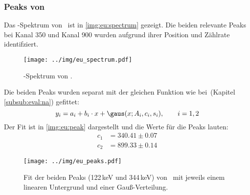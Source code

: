 \subsubsection{Peaks von \eu}
\label{subsub:eval:eu}
Das \textgamma-Spektrum von \eu\, ist in \autoref{img:eu:spectrum} gezeigt. Die beiden relevante Peaks bei Kanal 350 und Kanal 900 wurden aufgrund 
ihrer Position und Zählrate identifziert.
\begin{figure}[H]
\begin{center}
  \texttt{[image: ../img/eu\_spectrum.pdf]}
  \caption{\textgamma-Spektrum von .}
  \label{img:eu:spectrum}
\end{center}
\end{figure}
Die beiden Peaks wurden separat mit der gleichen Funktion wie bei \na\,(Kapitel \ref{subsub:eval:na}) gefittet:
\begin{equation}
  y_i = a_i + b_i \cdot x + \gaus(x; A_i, c_i, s_i), \qquad i = 1, 2
\end{equation}
Der Fit ist in \autoref{img:eu:peak} dargestellt und die Werte für die Peaks lauten:
\begin{equation}
\begin{split}
  \label{eq:eu:peaks}
  c_1 &= 340.41 \pm 0.07 \\
  c_2 &= 899.33 \pm 0.14
\end{split}
\end{equation}
\begin{figure}[H]
\begin{center}
  \texttt{[image: ../img/eu\_peaks.pdf]}
  \caption{Fit der beiden Peaks (122\,keV und 344\,keV) von \eu\, mit jeweils einem linearen Untergrund und einer Gauß-Verteilung.}
  \label{img:eu:peak}
\end{center}
\end{figure}

